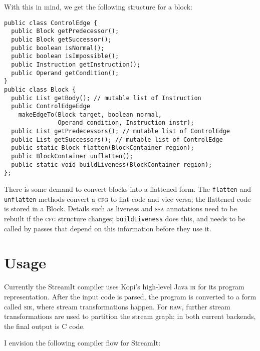\documentclass[11pt]{article}
\def\cfg{\textsc{cfg}}
\def\ir{\textsc{ir}}
\def\raw{\textsc{raw}}
\def\sir{\textsc{sir}}
\def\ssa{\textsc{ssa}}
\begin{document}
With this in mind, we get the following structure for a block:

\begin{verbatim}
public class ControlEdge {
  public Block getPredecessor();
  public Block getSuccessor();
  public boolean isNormal();
  public boolean isImpossible();
  public Instruction getInstruction();
  public Operand getCondition();
}
public class Block {
  public List getBody(); // mutable list of Instruction
  public ControlEdgeEdge
    makeEdgeTo(Block target, boolean normal,
               Operand condition, Instruction instr);
  public List getPredecessors(); // mutable list of ControlEdge
  public List getSuccessors(); // mutable list of ControlEdge
  public static Block flatten(BlockContainer region);
  public BlockContainer unflatten();
  public static void buildLiveness(BlockContainer region);
};
\end{verbatim}

There is some demand to convert blocks into a flattened form.  The
\texttt{flatten} and \texttt{unflatten} methods convert a \cfg{} to
flat code and vice versa; the flattened code is stored in a Block.
Details such as liveness and \ssa{} annotations need to be rebuilt if
the \cfg{} structure changes; \texttt{build\-Liveness} does this, and
needs to be called by passes that depend on this information before
they use it.

\section{Usage}

Currently the StreamIt compiler uses Kopi's high-level Java \ir{} for
its program representation.  After the input code is parsed, the
program is converted to a form called \sir{}, where stream
transformations happen.  For \raw{}, further stream transformations
are used to partition the stream graph; in both current backends, the
final output is C code.

I envision the following compiler flow for StreamIt:
\end{document}
